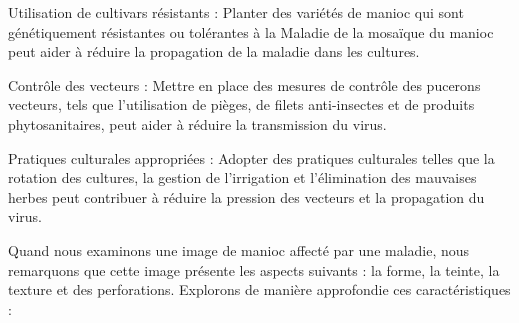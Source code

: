\begin{itemize}
	\textemdash  Utilisation de cultivars résistants : Planter des variétés de manioc qui sont génétiquement résistantes ou tolérantes à la Maladie de la mosaïque du manioc peut aider à réduire la propagation de la maladie dans les cultures.
	
	\textemdash  Contrôle des vecteurs : Mettre en place des mesures de contrôle des pucerons vecteurs, tels que l'utilisation de pièges, de filets anti-insectes et de produits phytosanitaires, peut aider à réduire la transmission du virus.
	
	\textemdash  Pratiques culturales appropriées : Adopter des pratiques culturales telles que la rotation des cultures, la gestion de l'irrigation et l'élimination des mauvaises herbes peut contribuer à réduire la pression des vecteurs et la propagation du virus.
\end{itemize}

Quand nous examinons une image de manioc affecté par une maladie, nous remarquons que cette image présente les aspects suivants : la forme, la teinte, la texture et des perforations.
Explorons de manière approfondie ces caractéristiques :

